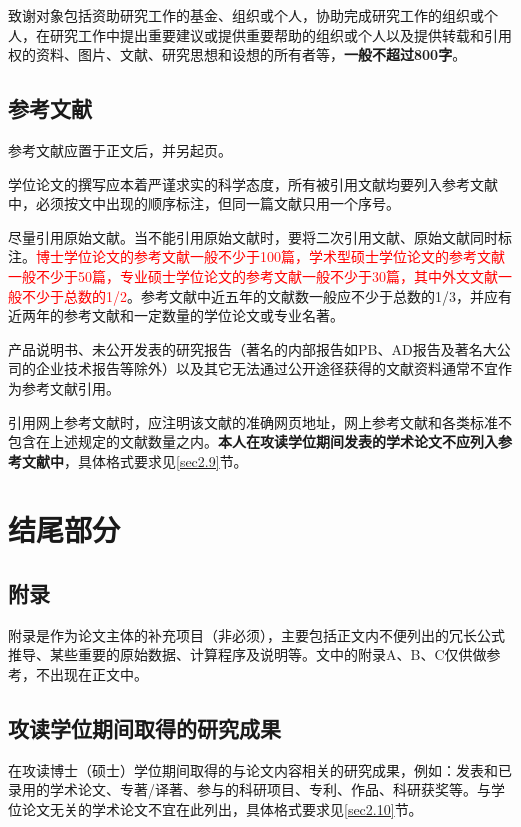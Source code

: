 致谢对象包括资助研究工作的基金、组织或个人，协助完成研究工作的组织或个人，在研究工作中提出重要建议或提供重要帮助的组织或个人以及提供转载和引用权的资料、图片、文献、研究思想和设想的所有者等，\textbf{一般不超过800字}。

\subsection{参考文献}

参考文献应置于正文后，并另起页。

学位论文的撰写应本着严谨求实的科学态度，所有被引用文献均要列入参考文献中，必须按文中出现的顺序标注，但同一篇文献只用一个序号。

尽量引用原始文献。当不能引用原始文献时，要将二次引用文献、原始文献同时标注。\textcolor{red}{博士学位论文的参考文献一般不少于100篇，学术型硕士学位论文的参考文献一般不少于50篇，专业硕士学位论文的参考文献一般不少于30篇，其中外文文献一般不少于总数的1/2}。参考文献中近五年的文献数一般应不少于总数的1/3，并应有近两年的参考文献和一定数量的学位论文或专业名著。

产品说明书、未公开发表的研究报告（著名的内部报告如PB、AD报告及著名大公司的企业技术报告等除外）以及其它无法通过公开途径获得的文献资料通常不宜作为参考文献引用。

引用网上参考文献时，应注明该文献的准确网页地址，网上参考文献和各类标准不包含在上述规定的文献数量之内。\textbf{本人在攻读学位期间发表的学术论文不应列入参考文献中}，具体格式要求见\ref{sec2.9}节。

\section{结尾部分}

\subsection{附录}

附录是作为论文主体的补充项目（非必须），主要包括正文内不便列出的冗长公式推导、某些重要的原始数据、计算程序及说明等。文中的附录A、B、C仅供做参考，不出现在正文中。

\subsection{攻读学位期间取得的研究成果}

在攻读博士（硕士）学位期间取得的与论文内容相关的研究成果，例如：发表和已录用的学术论文、专著/译著、参与的科研项目、专利、作品、科研获奖等。与学位论文无关的学术论文不宜在此列出，具体格式要求见\ref{sec2.10}节。

